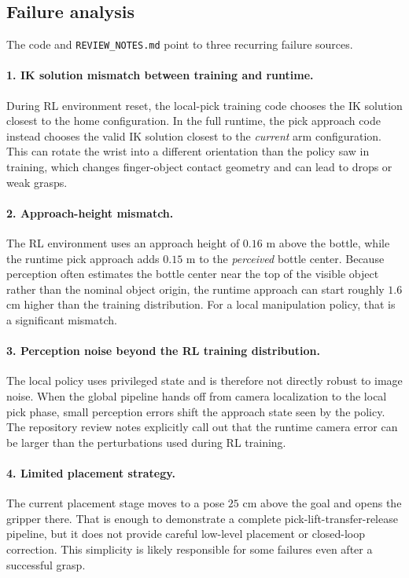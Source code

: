 \documentclass[11pt]{article}
\begin{document}
\subsection{Failure analysis}

The code and \texttt{REVIEW\_NOTES.md} point to three recurring failure sources.

\paragraph{1. IK solution mismatch between training and runtime.}
During RL environment reset, the local-pick training code chooses the IK solution closest to the home configuration. In the full runtime, the pick approach code instead chooses the valid IK solution closest to the \emph{current} arm configuration. This can rotate the wrist into a different orientation than the policy saw in training, which changes finger-object contact geometry and can lead to drops or weak grasps.

\paragraph{2. Approach-height mismatch.}
The RL environment uses an approach height of \(0.16\) m above the bottle, while the runtime pick approach adds \(0.15\) m to the \emph{perceived} bottle center. Because perception often estimates the bottle center near the top of the visible object rather than the nominal object origin, the runtime approach can start roughly \(1.6\) cm higher than the training distribution. For a local manipulation policy, that is a significant mismatch.

\paragraph{3. Perception noise beyond the RL training distribution.}
The local policy uses privileged state and is therefore not directly robust to image noise. When the global pipeline hands off from camera localization to the local pick phase, small perception errors shift the approach state seen by the policy. The repository review notes explicitly call out that the runtime camera error can be larger than the perturbations used during RL training.

\paragraph{4. Limited placement strategy.}
The current placement stage moves to a pose \(25\) cm above the goal and opens the gripper there. That is enough to demonstrate a complete pick-lift-transfer-release pipeline, but it does not provide careful low-level placement or closed-loop correction. This simplicity is likely responsible for some failures even after a successful grasp.
\end{document}
